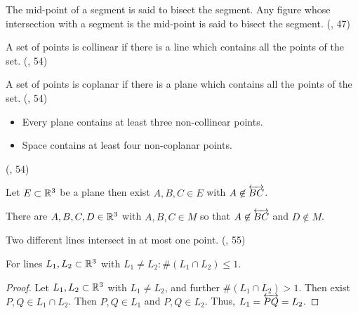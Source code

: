 \begin{definition}[Bisection]\label{def:Bisection}
  The mid-point of a segment is said to bisect the segment.
  Any figure whose intersection with a segment is the mid-point is said to bisect the segment.
  (\cite{SMSGGeometry}, 47)
\end{definition}

\begin{definition}[Collinear]\label{def:Collinear}
  A set of points is collinear if there is a line which contains all the points of the set.
  (\cite{SMSGGeometry}, 54)

\end{definition}

\begin{definition}[Coplanar]\label{def:Coplanar}
  A set of points is coplanar if there is a plane which contains all the points of the set.
  (\cite{SMSGGeometry}, 54)

\end{definition}

\begin{definition}[Postulate 5]\label{def:Postulate_5}
  \begin{itemize}
    \item Every plane contains at least three non-collinear points.
    \item Space contains at least four non-coplanar points.
  \end{itemize}
  (\cite{SMSGGeometry}, 54)

  Let $E \subset \mathbb{R}^3$ be a plane then exist $A, B, C \in E$ with $A \not\in \overleftrightarrow{BC}$.

  There are $A,B,C,D \in \mathbb{R}^3$ with $A,B,C \in M$ so that $A \not\in \overleftrightarrow{BC}$ and $D \not\in M$.
\end{definition}

\begin{theorem}[3-1.]\label{thm:3-1.}
  Two different lines intersect in at most one point.
  (\cite{SMSGGeometry}, 55)

  For lines $L_1,L_2 \subset \mathbb{R}^3$ with $L_1 \ne L_2: \#(L_1\cap L_2)\leq 1$.
\end{theorem}
\begin{proof}
  Let $L_1,L_2 \subset \mathbb{R}^3$ with $L_1\ne L_2$, and further $\#(L_1\cap L_2)>1$.
  Then exist $P,Q \in L_1\cap L_2$.
  Then $P,Q \in L_1$ and $P,Q \in L_2$.
  Thus, $L_1=\overleftrightarrow{PQ}=L_2$.
\end{proof}

